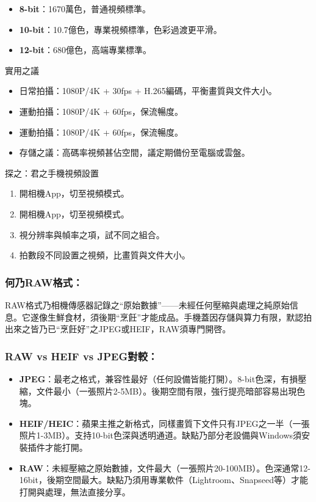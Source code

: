 \begin{itemize}
  \item \textbf{8-bit}：1670萬色，普通視頻標準。
  \item \textbf{10-bit}：10.7億色，專業視頻標準，色彩過渡更平滑。
  \item \textbf{12-bit}：680億色，高端專業標準。
\end{itemize}

\begin{tcbinfo}{實用之議}
\begin{itemize}
  \item 日常拍攝：1080P/4K + 30fps + H.265編碼，平衡畫質與文件大小。
  \item 運動拍攝：1080P/4K + 60fps，保流暢度。
  \item 運動拍攝：1080P/4K + 60fps，保流暢度。
  \item 存儲之議：高碼率視頻甚佔空間，議定期備份至電腦或雲盤。
\end{itemize}

\end{tcbinfo}

\begin{tcbpractice}{探之：君之手機視頻設置}
\begin{enumerate}
  \item 開相機App，切至視頻模式。
  \item 開相機App，切至視頻模式。
  \item 視分辨率與幀率之項，試不同之組合。
  \item 拍數段不同設置之視頻，比畫質與文件大小。
\end{enumerate}

\end{tcbpractice}


\subsubsection*{何乃RAW格式：}

RAW格式乃相機傳感器記錄之“原始數據”——未經任何壓縮與處理之純原始信息。它遂像生鮮食材，須後期“烹飪”才能成品。手機蓋因存儲與算力有限，默認拍出來之皆乃已“烹飪好”之JPEG或HEIF，RAW須專門開啓。

\subsubsection*{RAW vs HEIF vs JPEG對較：}

\begin{itemize}
  \item \textbf{JPEG}：最老之格式，兼容性最好（任何設備皆能打開）。8-bit色深，有損壓縮，文件最小（一張照片2-5MB）。後期空間有限，強行提亮暗部容易出現色塊。
  \item \textbf{HEIF/HEIC}：蘋果主推之新格式，同樣畫質下文件只有JPEG之一半（一張照片1-3MB）。支持10-bit色深與透明通道。缺點乃部分老設備與Windows須安裝插件才能打開。
  \item \textbf{RAW}：未經壓縮之原始數據，文件最大（一張照片20-100MB）。色深通常12-16bit，後期空間最大。缺點乃須用專業軟件（Lightroom、Snapseed等）才能打開與處理，無法直接分享。
\end{itemize}

